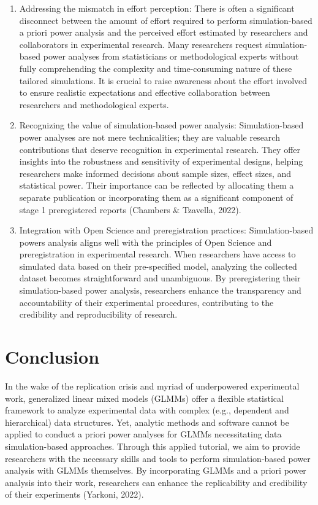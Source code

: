 \documentclass[
  man,floatsintext]{apa6}
\begin{document}
\begin{enumerate}
\item
  Addressing the mismatch in effort perception: There is often a significant disconnect between the amount of effort required to perform simulation-based a priori power analysis and the perceived effort estimated by researchers and collaborators in experimental research. Many researchers request simulation-based power analyses from statisticians or methodological experts without fully comprehending the complexity and time-consuming nature of these tailored simulations. It is crucial to raise awareness about the effort involved to ensure realistic expectations and effective collaboration between researchers and methodological experts.
\item
  Recognizing the value of simulation-based power analysis: Simulation-based power analyses are not mere technicalities; they are valuable research contributions that deserve recognition in experimental research. They offer insights into the robustness and sensitivity of experimental designs, helping researchers make informed decisions about sample sizes, effect sizes, and statistical power. Their importance can be reflected by allocating them a separate publication or incorporating them as a significant component of stage 1 preregistered reports (Chambers \& Tzavella, 2022).
\item
  Integration with Open Science and preregistration practices: Simulation-based powers analysis aligns well with the principles of Open Science and preregistration in experimental research. When researchers have access to simulated data based on their pre-specified model, analyzing the collected dataset becomes straightforward and unambiguous. By preregistering their simulation-based power analysis, researchers enhance the transparency and accountability of their experimental procedures, contributing to the credibility and reproducibility of research.
\end{enumerate}

\hypertarget{conclusion}{%
\section{Conclusion}\label{conclusion}}

In the wake of the replication crisis and myriad of underpowered experimental work, generalized linear mixed models (GLMMs) offer a flexible statistical framework to analyze experimental data with complex (e.g., dependent and hierarchical) data structures. Yet, analytic methods and software cannot be applied to conduct a priori power analyses for GLMMs necessitating data simulation-based approaches. Through this applied tutorial, we aim to provide researchers with the necessary skills and tools to perform simulation-based power analysis with GLMMs themselves. By incorporating GLMMs and a priori power analysis into their work, researchers can enhance the replicability and credibility of their experiments (Yarkoni, 2022).
\end{document}
